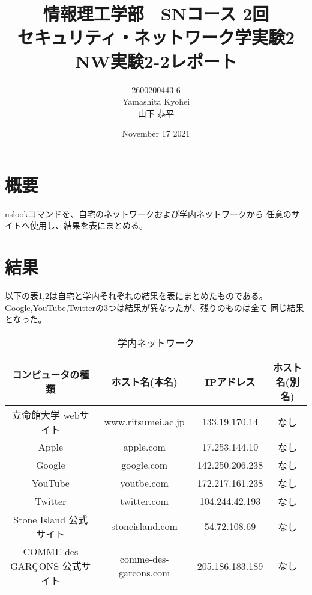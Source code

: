 \documentclass[dvipdfmx,autodetect-engine,titlepage]{jsarticle}
\title{情報理工学部　SNコース 2回\\
セキュリティ・ネットワーク学実験2\\
NW実験2-2レポート}
\author{2600200443-6\\Yamashita Kyohei\\山下 恭平}
\date{November 17 2021}
\begin{document}
\maketitle

\section{概要}
nslookコマンドを、自宅のネットワークおよび学内ネットワークから
任意のサイトへ使用し、結果を表にまとめる。

\section{結果}
以下の表1,2は自宅と学内それぞれの結果を表にまとめたものである。\\
Google,YouTube,Twitterの3つは結果が異なったが、残りのものは全て
同じ結果となった。

\begin{table}[h]
  \centering
  \caption{学内ネットワーク}
  \begin{tabular}{|c|c|c|c|}
  \hline
  コンピュータの種類               & ホスト名(本名)              & IPアドレス          & ホスト名(別名) \\ \hline
  立命館大学 webサイト            & www.ritsumei.ac.jp    & 133.19.170.14   & なし       \\ \hline
  Apple                   & apple.com             & 17.253.144.10   & なし       \\ \hline
  Google                  & google.com            & 142.250.206.238 & なし       \\ \hline
  YouTube                 & youtbe.com            & 172.217.161.238 & なし       \\ \hline
  Twitter                 & twitter.com           & 104.244.42.193  & なし       \\ \hline
  Stone Island 公式サイト      & stoneisland.com       & 54.72.108.69    & なし       \\ \hline
  COMME des GARÇONS 公式サイト & comme-des-garcons.com & 205.186.183.189 & なし       \\ \hline
  \end{tabular}
  \end{table}
\end{document}
